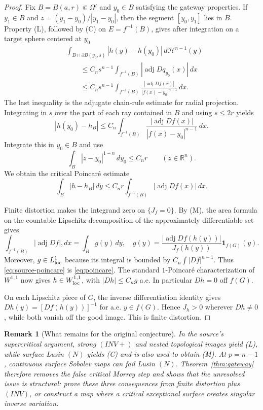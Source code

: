 \documentclass[11pt]{article}
\newtheorem{remark}{Remark}
\newcommand{\R}{\mathbb R}
\newcommand{\adj}{\operatorname{adj}}
\begin{document}
\begin{proof}
Fix $B=B(a,r)\Subset\Omega'$ and $y_0\in B$ satisfying the gateway
properties.  If $y_1\in B$ and
$z=(y_1-y_0)/|y_1-y_0|$, then the segment $[y_0,y_1]$ lies in $B$.
Property (L), followed by (C) on $E=f^{-1}(B)$, gives after integration on a
target sphere centered at $y_0$
\begin{align*}
 &\int_{B\cap\partial B(y_0,s)}|h(y)-h(y_0)|\,d\mathcal H^{n-1}(y)\\
 &\qquad\leq C_n s^{n-1}
 \int_{f^{-1}(B)}|\adj Dq_{y_0}(x)|\,dx\\
 &\qquad\leq C_n s^{n-1}
 \int_{f^{-1}(B)}
 \frac{|\adj Df(x)|}{|f(x)-y_0|^{n-1}}\,dx .
\end{align*}
The last inequality is the adjugate chain-rule estimate for radial
projection.  Integrating in $s$ over the part of each ray contained in $B$
and using $s\le2r$ yields
\[
 |h(y_0)-h_B|
 \leq C_n\int_{f^{-1}(B)}
 \frac{|\adj Df(x)|}{|f(x)-y_0|^{n-1}}\,dx .
\]
Integrate this in $y_0\in B$ and use
\[
 \int_B |z-y_0|^{1-n}\,dy_0\leq C_n r
 \qquad(z\in\R^n).
\]
We obtain the critical Poincar\'e estimate
\begin{equation}\label{eq:source-poincare}
 \int_B|h-h_B|\,dy
 \leq C_n r\int_{f^{-1}(B)}|\adj Df(x)|\,dx.
\end{equation}

Finite distortion makes the integrand zero on $\{J_f=0\}$.  By (M), the
area formula on the countable Lipschitz decomposition of the approximately
differentiable set gives
\[
 \int_{f^{-1}(B)}|\adj Df|,dx
 =\int_B g(y)\,dy,
 \quad
 g(y)=\frac{|\adj Df(h(y))|}{J_f(h(y))}\mathbf1_{f(G)}(y).
\]
Moreover, $g\in L^1_{\rm loc}$ because its integral is bounded by
$C_n\int |Df|^{n-1}$.  Thus \eqref{eq:source-poincare} is
\eqref{eq:poincare}.  The standard $1$-Poincar\'e characterization of
$W^{1,1}$ now gives $h\in W^{1,1}_{\rm loc}$, with $|Dh|\leq C_ng$ a.e.
In particular $Dh=0$ off $f(G)$.

On each Lipschitz piece of $G$, the inverse differentiation identity gives
$Dh(y)=[Df(h(y))]^{-1}$ for a.e. $y\in f(G)$.  Hence $J_h>0$ wherever
$Dh\ne0$, while both vanish off the good image.  This is finite distortion.
\end{proof}

\begin{remark}[What remains for the original conjecture]
In the source's supercritical argument, strong $(INV+)$ and nested
topological images yield (L), while surface Lusin $(N)$ yields (C) and is also
used to obtain (M).  At $p=n-1$, continuous surface Sobolev maps can fail
Lusin $(N)$.  Theorem~\ref{thm:gateway} therefore removes the false critical
Morrey step and shows that the unresolved issue is structural: prove these
three consequences from finite distortion plus $(INV)$, or construct a map
where a critical exceptional surface creates singular inverse variation.
\end{remark}
\end{document}
